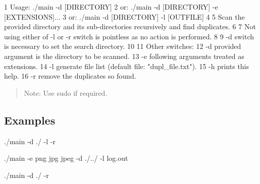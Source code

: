 \begin{DoxyCode}
1 Usage: ./main -d [DIRECTORY]
2 or: ./main -d [DIRECTORY] -e [EXTENSIONS]...
3 or: ./main -d [DIRECTORY] -l [OUTFILE]
4 
5 Scan the provided directory and its sub-directories recursively and find duplicates.
6 
7 Not using either of -l or -r switch is pointless as no action is performed.
8 
9 -d switch is necessary to set the search directory.
10 
11 Other switches:
12     -d      provided argument is the directory to be scanned.
13     -e      following arguments treated as extensions.
14     -l      generate file list (default file: "dupl\_file.txt").
15     -h      prints this help.
16     -r      remove the duplicates so found.
\end{DoxyCode}
 \begin{quote}
Note\+: Use {\ttfamily sudo} if required. \end{quote}


\subsection*{Examples}


\begin{DoxyEnumerate}
\item {\ttfamily ./main -\/d ./ -\/l -\/r}
\item {\ttfamily ./main -\/e png jpg jpeg -\/d ./../ -\/l log.\+out}
\item {\ttfamily ./main -\/d ./ -\/r} 
\end{DoxyEnumerate}